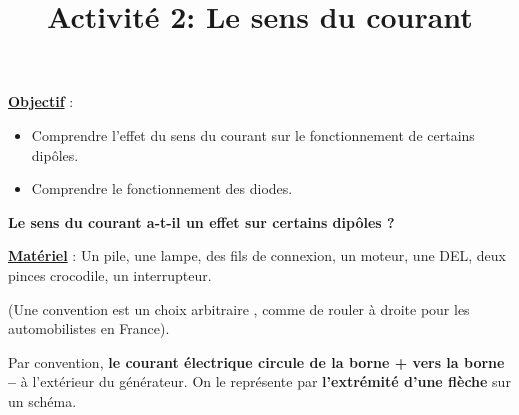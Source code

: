 \documentclass[10pt]{article}
\newcommand{\titreActivite}{Activité 2: Le sens du courant} %
\newcommand{\objectif}{ 	
	
	\begin{itemize}
		\item Comprendre l'effet du sens du courant sur le fonctionnement de certains dipôles.
		\item Comprendre le fonctionnement des diodes.
	\end{itemize}
}
\newcommand{\resumeContexte}{
	Le sens du courant a-t-il un effet sur certains dipôles ?
	} %
\begin{document}
\date{}
\title{\titreActivite}
\maketitle %


\underline{\textbf{Objectif}} :  \vspace{2pt}
\objectif

\vspace{4pt}


\textbf{\resumeContexte}


\vspace{-12pt}


\textbf{\underline{Matériel}} : Un pile, une lampe, des fils de connexion, un moteur, une DEL, deux pinces
 crocodile, un
interrupteur.


\begin{mybox}[Convention]
	(Une convention est un choix arbitraire
	, comme de rouler à droite pour les automobilistes en France). 
	
	Par convention,
	\textbf{le courant électrique circule de la borne +
	vers la borne –} à l’extérieur du générateur.
	On le représente par \textbf{l’extrémité d’une flèche} sur un schéma.

\end{mybox}

\begin{question}
	
	\end{question}
	
\end{document}
